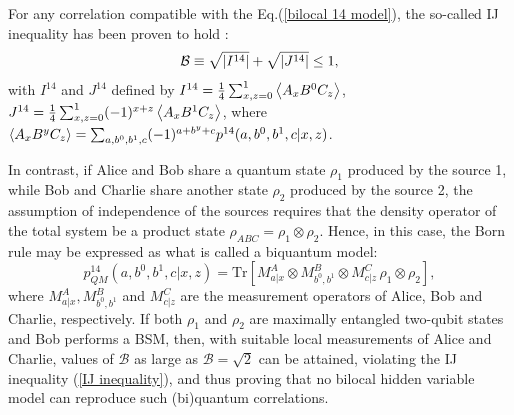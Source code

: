 \documentclass[aps,pra,reprint, superscriptaddress,showkeys]{revtex4-2}
\theoremstyle{plain}
\begin{document}
 For any correlation compatible with the Eq.(\ref{bilocal 14 model}), the so-called IJ inequality has been proven to hold \cite{branciardbilocal}:
\begin{equation}
\mathcal{B}\equiv\sqrt{\abs{I^{14}}}+ \sqrt{\abs{J^{14}}}\leq 1,
\label{IJ inequality}
\end{equation}
with $I^{14}$ and $J^{14}$ defined by $ I^{14} = \frac{1}{4}\sum_{x,z=0}^1\expval{A_xB^0C_z}$, $ J^{14}= \frac{1}{4}\sum_{x,z=0}^1(-1)^{x+z}\expval{A_xB^1C_z}$, where $\expval{A_x B^y C_z} = \sum_{a,b^0,b^1,c}(-1)^{a+b^y+c}p^{14}(a,b^0,b^1,c|x,z)$.

In contrast, if Alice and Bob share a quantum state $\rho_1$ produced by the source 1, while Bob and Charlie share another state $\rho_2$ produced by the source 2, the assumption of independence of the sources requires that the density operator of the total system be a product state $\rho_{ABC}= \rho_1\otimes \rho_2$. Hence, in this case, the Born rule may be expressed as what is called a biquantum model:
\begin{equation}
    p^{14}_{QM}(a,b^0,b^1,c|x,z) = \mathrm{Tr}[M^A_{a|x}\otimes M^B_{b^0,b^1}\otimes M^C_{c|z}\,\rho_1\otimes \rho_2],
\end{equation}
where $M^A_{a|x}, M^B_{b^0,b^1}$ and $M^C_{c|z}$ are the measurement operators of Alice, Bob and Charlie, respectively. If both $\rho_1$ and $\rho_2$ are maximally entangled two-qubit states and Bob performs a BSM, then, with suitable local measurements of Alice and Charlie, values of $\mathcal{B}$ as large as $\mathcal{B}= \sqrt{2}$ can be attained, violating the IJ inequality (\ref{IJ inequality}), and thus proving that no bilocal hidden variable model can reproduce such (bi)quantum correlations. 
\end{document}
